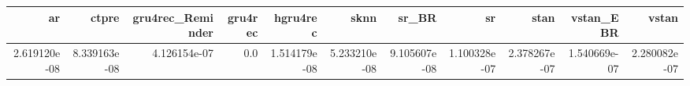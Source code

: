 \begin{tabular}{rrrrrrrrrrr}
\toprule
           ar &         ctpre &  gru4rec\_Reminder &  gru4rec &      hgru4rec &          sknn &         sr\_BR &            sr &          stan &     vstan\_EBR &         vstan \\
\midrule
 2.619120e-08 &  8.339163e-08 &      4.126154e-07 &      0.0 &  1.514179e-08 &  5.233210e-08 &  9.105607e-08 &  1.100328e-07 &  2.378267e-07 &  1.540669e-07 &  2.280082e-07 \\
\bottomrule
\end{tabular}
